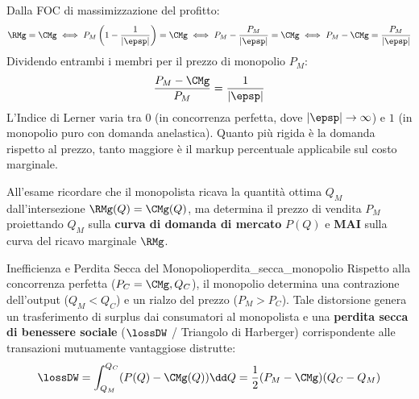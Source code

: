 \begin{dimostrazione}
Dalla FOC di massimizzazione del profitto:
\begin{equation*}
    \RMg = \CMg \iff P_M \left( 1 - \frac{1}{|\epsp|} \right) = \CMg \iff P_M - \frac{P_M}{|\epsp|} = \CMg \iff P_M - \CMg = \frac{P_M}{|\epsp|}
\end{equation*}
Dividendo entrambi i membri per il prezzo di monopolio $P_M$:
\begin{equation*}
    \frac{P_M - \CMg}{P_M} = \frac{1}{|\epsp|}
\end{equation*}
L'Indice di Lerner varia tra $0$ (in concorrenza perfetta, dove $|\epsp| \to \infty$) e $1$ (in monopolio puro con domanda anelastica). Quanto più rigida è la domanda rispetto al prezzo, tanto maggiore è il markup percentuale applicabile sul costo marginale.
\end{dimostrazione}

\begin{esame}
All'esame ricordare che il monopolista ricava la quantità ottima $Q_M$ dall'intersezione $\RMg(Q) = \CMg(Q)$, ma determina il prezzo di vendita $P_M$ proiettando $Q_M$ sulla \textbf{curva di domanda di mercato} $P(Q)$ e \textbf{MAI} sulla curva del ricavo marginale $\RMg$.
\end{esame}

\begin{teorema}{Inefficienza e Perdita Secca del Monopolio}{perdita_secca_monopolio}
Rispetto alla concorrenza perfetta ($P_C = \CMg, Q_C$), il monopolio determina una contrazione dell'output ($Q_M < Q_C$) e un rialzo del prezzo ($P_M > P_C$). Tale distorsione genera un trasferimento di surplus dai consumatori al monopolista e una \textbf{perdita secca di benessere sociale} ($\lossDW$ / Triangolo di Harberger) corrispondente alle transazioni mutuamente vantaggiose distrutte:
\begin{equation}
    \lossDW = \int_{Q_M}^{Q_C} (P(Q) - \CMg(Q)) \dd Q = \frac{1}{2} (P_M - \CMg)(Q_C - Q_M)
\end{equation}
\end{teorema}

